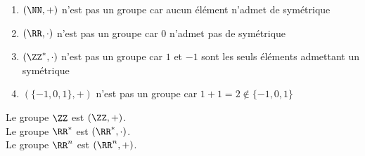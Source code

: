 \documentclass[../main.tex]{subfile}
\begin{document}
\begin{ex}
\begin{ctex}
\begin{enumerate}	
	\item $(\NN, +)$ n'est pas un groupe car aucun élément n'admet de symétrique
	\item $(\RR, \cdot)$ n'est pas un groupe car $0$ n'admet pas de symétrique
	\item $(\ZZ^*, \cdot)$ n'est pas un groupe car $1$ et $-1$ sont les seuls éléments admettant un symétrique
	\item $(\{-1, 0, 1\}, +)$ n'est pas un groupe car $1 + 1 = 2 \notin \{-1, 0, 1\}$
\end{enumerate}
\end{ctex}

\begin{rema}
	Le groupe $\ZZ$ est $(\ZZ, +)$.\\
	Le groupe $\RR^*$ est $(\RR^*, \cdot)$.\\
	Le groupe $\RR^n$ est $(\RR^n, +)$.\\
\end{rema}
















































\end{ex}
\end{document}
